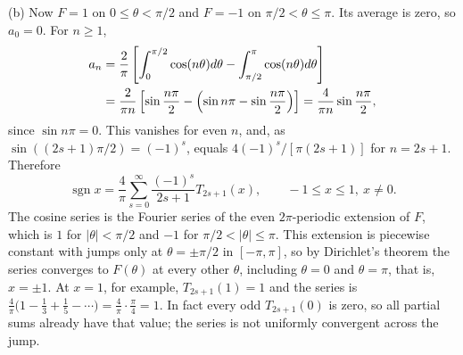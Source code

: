 (b) Now $F=1$ on $0\le\theta<\pi/2$ and $F=-1$ on
$\pi/2<\theta\le\pi$.  Its average is zero, so $a_0=0$.  For $n\ge1$,
\begin{align*}
a_n&=\frac2\pi\left[\int_0^{\pi/2}\cos(n\theta)d\theta
              -\int_{\pi/2}^{\pi}\cos(n\theta)d\theta\right]\\
 &=\frac2{\pi n}\left[\sin\frac{n\pi}2
   -\Bigl(\sin n\pi-\sin\frac{n\pi}2\Bigr)\right]
 =\frac4{\pi n}\sin\frac{n\pi}{2},
\end{align*}
since $\sin n\pi=0$.
This vanishes for even $n$, and, as $\sin((2s+1)\pi/2)=(-1)^s$, equals
$4(-1)^s/[\pi(2s+1)]$ for $n=2s+1$.  Therefore
\[
\boxed{\operatorname{sgn}x=\frac4\pi\sum_{s=0}^\infty
 \frac{(-1)^s}{2s+1}T_{2s+1}(x)},\qquad -1\le x\le1,\ x\ne0.
\]
The cosine series is the Fourier series of the even $2\pi$-periodic
extension of $F$, which is $1$ for $|\theta|<\pi/2$ and $-1$ for
$\pi/2<|\theta|\le\pi$.  This extension is piecewise constant with
jumps only at $\theta=\pm\pi/2$ in $[-\pi,\pi]$, so by Dirichlet's
theorem the series converges to $F(\theta)$ at every other $\theta$,
including $\theta=0$ and $\theta=\pi$, that is, $x=\pm1$.  At $x=1$,
for example, $T_{2s+1}(1)=1$ and the series is
$\frac4\pi\bigl(1-\frac13+\frac15-\cdots\bigr)=\frac4\pi\cdot\frac\pi4=1$.
  In fact every odd $T_{2s+1}(0)$ is zero, so all partial
sums already have that value; the series is not uniformly convergent
across the jump.

